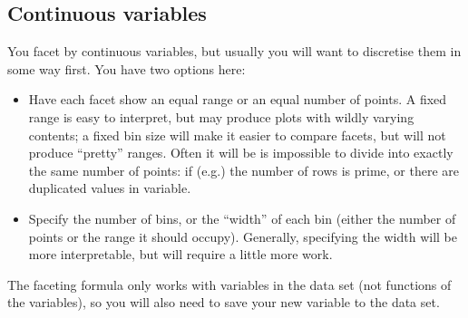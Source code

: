 % 


\subsection{Continuous variables}\label{sub:continuous_variables}

You facet by continuous variables, but usually you will want to discretise them in some way first.  You have two options here:

\begin{itemize}
  \item Have each facet show an equal range or an equal number of points.  A fixed range is easy to interpret, but may produce plots with wildly varying contents; a fixed bin size will make it easier to compare facets, but will not produce ``pretty'' ranges.  Often it will be is impossible to divide into exactly the same number of points: if (e.g.) the number of rows is prime, or there are duplicated values in variable.
    
  \item Specify the number of bins, or the ``width'' of each bin (either the number of points or the range it should occupy).  Generally, specifying the width will be more interpretable, but will require a little more work.
  
\end{itemize}

The faceting formula only works with variables in the data set (not functions of the variables), so you will also need to save your new variable to the data set.

% 
% 
% 
% 



